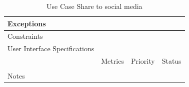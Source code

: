 \begin{table}[H]
\begin{tabularx}{\linewidth}{|l|X|X|X|}
            \hline Exceptions                    & \multicolumn{3}{l|}{}                                                                                 \\

            \hline Constraints                   & \multicolumn{3}{l|}{}                                                                                 \\

            \hline User Interface Specifications & \multicolumn{3}{l|}{}                                                                                 \\

            \hline \multirow{2}{*}{}             & Metrics                                                                           & Priority & Status \\
            \cline{2-4}                          &                                                                                   &          &        \\
            \hline Notes                         & \multicolumn{3}{l|}{}                                                                                 \\
            \hline
      \end{tabularx}
      \caption{Use Case Share to social media}
      \label{tab:use_case_share_to_social_media}
\end{table}

